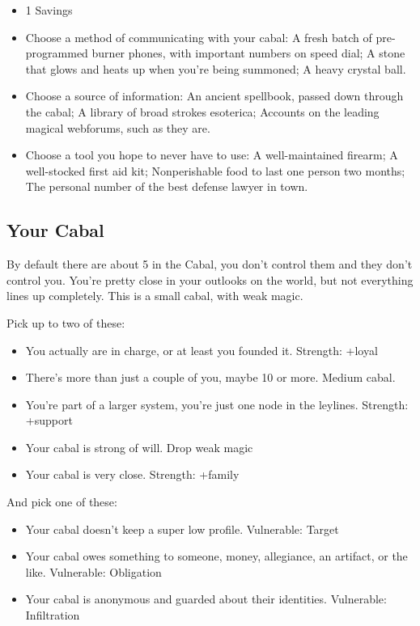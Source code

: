 \documentclass[
  oneside,
  statementpaper,
  9pt]{memoir}
\begin{document}
\begin{itemize}
\tightlist
\item
  1 Savings
\item
  Choose a method of communicating with your cabal: A fresh batch of
  pre-programmed burner phones, with important numbers on speed dial; A
  stone that glows and heats up when you're being summoned; A heavy
  crystal ball.
\item
  Choose a source of information: An ancient spellbook, passed down
  through the cabal; A library of broad strokes esoterica; Accounts on
  the leading magical webforums, such as they are.
\item
  Choose a tool you hope to never have to use: A well-maintained
  firearm; A well-stocked first aid kit; Nonperishable food to last one
  person two months; The personal number of the best defense lawyer in
  town.
\end{itemize}

\hypertarget{your-cabal}{%
\subsection{Your Cabal}\label{your-cabal}}

By default there are about 5 in the Cabal, you don't control them and
they don't control you. You're pretty close in your outlooks on the
world, but not everything lines up completely. This is a small cabal,
with weak magic.

Pick up to two of these:

\begin{itemize}
\tightlist
\item
  You actually are in charge, or at least you founded it. Strength:
  +loyal
\item
  There's more than just a couple of you, maybe 10 or more. Medium
  cabal.
\item
  You're part of a larger system, you're just one node in the leylines.
  Strength: +support
\item
  Your cabal is strong of will. Drop weak magic
\item
  Your cabal is very close. Strength: +family
\end{itemize}

And pick one of these:

\begin{itemize}
\tightlist
\item
  Your cabal doesn't keep a super low profile. Vulnerable: Target
\item
  Your cabal owes something to someone, money, allegiance, an artifact,
  or the like. Vulnerable: Obligation
\item
  Your cabal is anonymous and guarded about their identities.
  Vulnerable: Infiltration
\end{itemize}
\end{document}
